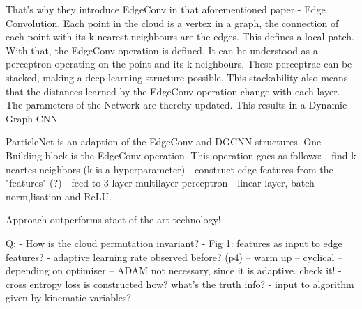 That's why they introduce EdgeConv in that aforementioned paper - Edge
Convolution. Each point in the cloud is a vertex in a graph, the connection of
each point with its k nearest neighbours are the edges. This defines a local
patch. With that, the EdgeConv operation is defined. It can be understood as a
perceptron operating on the point and its k neighbours.
These perceptrae can be stacked, making a deep learning structure possible. This
stackability also means that the distances learned by the EdgeConv operation
change with each layer. The parameters of the Network are thereby updated. This
results in a Dynamic Graph CNN.

ParticleNet is an adaption of the EdgeConv and DGCNN structures. 
One Building block is the EdgeConv operation. This operation goes as follows:
- find k neartes neighbors (k is a hyperparameter)
- construct edge features from the "features" (?)
- feed to 3 layer multilayer perceptron - linear layer, batch norm,lisation and
ReLU. 
- 

Approach outperforms staet of the art technology!


Q: 
- How is the cloud permutation invariant? 
- Fig 1: features as input to edge features?
- adaptive learning rate observed before? (p4)
-- warm up
-- cyclical
-- depending on optimiser
-- ADAM not necessary, since it is adaptive. check it!
- cross entropy loss is constructed how? what's the truth info?
- input to algorithm given by kinematic variables?


